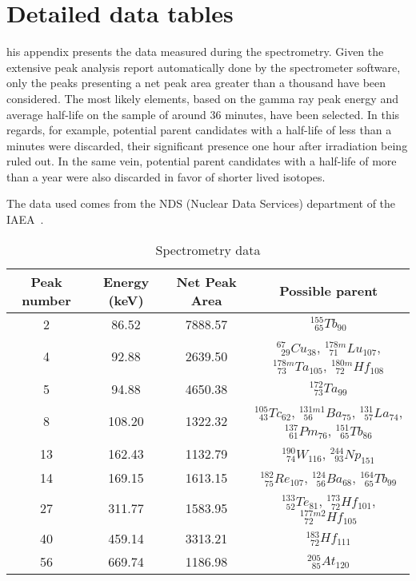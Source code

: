 \chapter{Detailed data tables}
\label{app:app02}

his appendix presents the data measured during the spectrometry. Given the extensive peak analysis report automatically done by the spectrometer software, only the peaks presenting a net peak area greater than a thousand have been considered. The most likely elements, based on the gamma ray peak energy and average half-life on the sample of around 36 minutes, have been selected. In this regards, for example, potential parent candidates with a half-life of less than a minutes were discarded, their significant presence one hour after irradiation being ruled out. In the same vein, potential parent candidates with a half-life of more than a year were also discarded in favor of shorter lived isotopes.

The data used comes from the NDS (Nuclear Data Services) department of the IAEA~\cite{iaea_nds}.

\renewcommand{\arraystretch}{2}
\begin{table}[!htb]
    \centering
        \begin{tabular}{cccc}
        \hline
        Peak number & Energy (keV) & Net Peak Area & Possible parent \\ \hline\hline
		2           & 86.52        & 7888.57       & $^{155}_{\phantom{0}65}Tb_{90}$ \\
		4           & 92.88        & 2639.50       & $^{67}_{\phantom{0}29}Cu_{38}$, $^{178m}_{\phantom{0}71}Lu_{107}$, $^{178m}_{\phantom{0}73}Ta_{105}$, $^{180m}_{\phantom{0}72}Hf_{108}$ \\
		5           & 94.88        & 4650.38       & $^{172}_{\phantom{0}73}Ta_{99}$ \\
		8           & 108.20       & 1322.32       & $^{105}_{\phantom{0}43}Tc_{62}$, $^{131m1}_{\phantom{0}56}Ba_{75}$, $^{131}_{\phantom{0}57}La_{74}$, $^{137}_{\phantom{0}61}Pm_{76}$, $^{151}_{\phantom{0}65}Tb_{86}$ \\
		13          & 162.43       & 1132.79       & $^{190}_{\phantom{0}74}W_{116}$, $^{244}_{\phantom{0}93}Np_{151}$ \\
		14          & 169.15       & 1613.15       & $^{182}_{\phantom{0}75}Re_{107}$, $^{124}_{\phantom{0}56}Ba_{68}$, $^{164}_{\phantom{0}65}Tb_{99}$ \\
		27          & 311.77       & 1583.95       & $^{133}_{\phantom{0}52}Te_{81}$, $^{173}_{\phantom{0}72}Hf_{101}$, $^{177m2}_{\phantom{0}72}Hf_{105}$\\
		40          & 459.14       & 3313.21       & $^{183}_{\phantom{0}72}Hf_{111}$\\
		56          & 669.74       & 1186.98       & $^{205}_{\phantom{0}85}At_{120}$
        \end{tabular}
        \caption{Spectrometry data}\label{tab:specdata}
\end{table}




\
